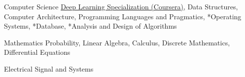 

\begin{cvskills}

  \cvskill
    {Computer Science} %
    {{\href{https://www.coursera.org/specializations/deep-learning}{Deep Learning Specialization (Coursera)}}, Data Structures, Computer Architecture, Programming Languages \newline and Pragmatics, *Operating Systems, *Database, *Analysis and Design of Algorithms} %


  \cvskill
    {Mathematics} %
    {Probability, Linear Algebra, Calculus, Discrete Mathematics, Differential Equations} %

\cvskill
{Electrical} %
{Signal and Systems} %


\end{cvskills}
